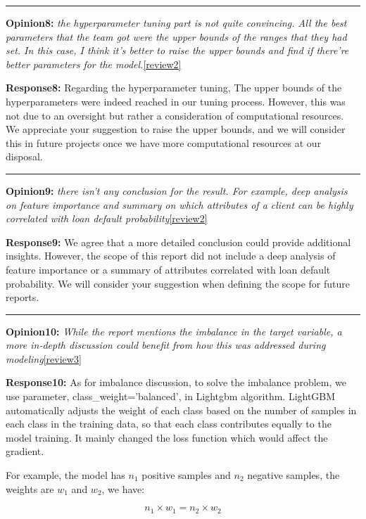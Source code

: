 \documentclass{article}
\begin{document}
\noindent\rule[0.5ex]{16cm}{1pt}

\textbf{Opinion8:} 
\textit{the hyperparameter tuning part is not quite convincing. All the best parameters that the
team got were the upper bounds of the ranges that they had set. In this case, I think
it’s better to raise the upper bounds and find if there’re better parameters for the
model.}\ref{review2}

\textbf{Response8:}
Regarding the hyperparameter tuning, The upper bounds of the hyperparameters were indeed reached in our tuning process. However, this was not due to an oversight but rather a consideration of computational resources. We appreciate your suggestion to raise the upper bounds, and we will consider this in future projects once we have more computational resources at our disposal.

\noindent\rule[0.5ex]{16cm}{1pt}

\textbf{Opinion9:} 
\textit{there isn’t any conclusion for the result. For example, deep analysis on feature importance and summary on which attributes of a client can be highly correlated with loan default probability}\ref{review2}

\textbf{Response9:}
We agree that a more detailed conclusion could provide additional insights. However, the scope of this report did not include a deep analysis of feature importance or a summary of attributes correlated with loan default probability. We will consider your suggestion when defining the scope for future reports.

\noindent\rule[0.5ex]{16cm}{1pt}

\textbf{Opinion10:} 
\textit{While the report mentions the imbalance in the target variable, a more in-depth discussion could benefit from how this was addressed during modeling}\ref{review3}

\textbf{Response10:}
As for imbalance discussion, to solve the imbalance problem, we use parameter, class\_weight='balanced', in Lightgbm algorithm. LightGBM automatically adjusts the weight of each class based on the number of samples in each class in the training data, so that each class contributes equally to the model training. It mainly changed the loss function which would affect the gradient.

For example, the model has $n_1$ positive samples and $n_2$ negative samples, the weights are $w_1$ and $w_2$, we have:

$$n_1\times w_1 = n_2 \times w_2$$
\end{document}
